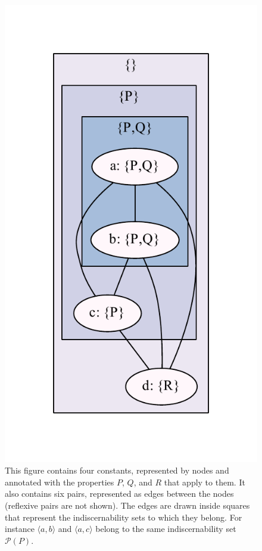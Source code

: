 \documentclass[letterpaper]{article}
\begin{document}
\begin{figure}
\caption{This figure contains four constants, represented by nodes and annotated with the properties $P$, $Q$, and $R$ that apply to them. It also contains six pairs, represented as edges between the nodes (reflexive pairs are not shown). The edges are drawn inside squares that represent the indiscernability sets to which they belong. For instance $\langle a, b \rangle$ and $\langle a, c \rangle$ belong to the same indiscernability set $\mathcal{P}(P)$.}
\label{fig:indiscernibility_example}
\includegraphics{indiscernibility_example}
\end{figure}
\end{document}
